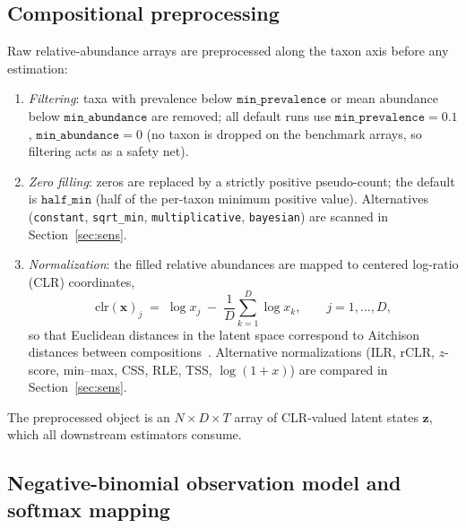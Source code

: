 \documentclass[11pt]{article}
\begin{document}
\subsection{Compositional preprocessing}\label{sec:preprocess}

Raw relative-abundance arrays are preprocessed along the taxon axis before any estimation:
\begin{enumerate}
\item \emph{Filtering}: taxa with prevalence below $\texttt{min\_prevalence}$ or mean abundance
below $\texttt{min\_abundance}$ are removed; all default runs use
$\texttt{min\_prevalence}=0.1$, $\texttt{min\_abundance}=0$ (no taxon is dropped on the benchmark
arrays, so filtering acts as a safety net).
\item \emph{Zero filling}: zeros are replaced by a strictly positive pseudo-count; the default is
$\texttt{half\_min}$ (half of the per-taxon minimum positive value). Alternatives
(\texttt{constant}, \texttt{sqrt\_min}, \texttt{multiplicative}, \texttt{bayesian}) are scanned in
Section~\ref{sec:sens}.
\item \emph{Normalization}: the filled relative abundances are mapped to centered log-ratio (CLR)
coordinates,
\begin{equation}\label{eq:clr}
\mathrm{clr}(\mathbf{x})_j \;=\; \log x_j \;-\; \frac{1}{D}\sum_{k=1}^{D}\log x_k ,
\qquad j=1,\dots,D ,
\end{equation}
so that Euclidean distances in the latent space correspond to Aitchison distances between
compositions~\cite{gloor2017compositional}. Alternative normalizations (ILR, rCLR, $z$-score,
min--max, CSS, RLE, TSS, $\log(1+x)$) are compared in Section~\ref{sec:sens}.
\end{enumerate}
The preprocessed object is an $N\times D\times T$ array of CLR-valued latent states
$\mathbf{z}$, which all downstream estimators consume.

\subsection{Negative-binomial observation model and softmax mapping}\label{sec:nb}
\end{document}
